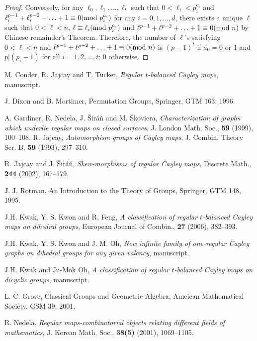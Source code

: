 \documentclass[12pt]{amsart}
\begin{document}
\begin{proof}
Conversely, for any $\ell_0, \ell_1, \ldots, \ell_t$ such that  $0
< \ell_i < p_i^{a_i}$ and  $\ell_i^{p-1} + \ell_i^{p-2} + \ldots +
1 \equiv  0 ({\hbox{\rm mod }} p_i^{a_i})$ for any $i = 0,1,\ldots, d$, there
exists a unique $\ell$ such that $0 < \ell < n$, $\ell \equiv \ell_i
({\hbox{\rm mod }} p_i^{a_i})$ and $\ell^{p-1}+\ell^{p-2}+\ldots+1 \equiv 0
({\hbox{\rm mod }} n)$ by Chinese remainder's Theorem. Therefore, the number of
$\ell$'s satisfying  $0 < \ell < n$ and
$\ell^{p-1}+\ell^{p-2}+\ldots+1 \equiv 0 ({\hbox{\rm mod }} n)$ is $(p-1)^{t}$
if $a_0=0$ or 1 and $p | (p_i -1)$ for all $i =1,2, \ldots, t$; 0
otherwise.
\end{proof}

\begin{thebibliography}{99}
 M. Conder, R. Jajcay and T. Tucker, \textit{Regular $t$-balanced Cayley maps}, manuscript.

 J. Dixon and B. Mortimer, Permutation Groups, Springer, GTM 163, 1996.

  A. Gardiner, R. Nedela, J. \v{S}ir\'{a}\v{n} and M. \v{S}koviera,
        \textit{Characterization of graphs which underlie regular maps on closed surfaces},
       J. London Math. Soc.,  {\bf 59} (1999), 100--108.
  R. Jajcay, \textit{Automorphism groups of Cayley maps},
J. Combin. Theory Ser. B, {\bf 59} (1993), 297--310.

 R. Jajcay and J. \v Sir\' a\v n, \textit{Skew-morphisms of regular
Cayley maps}, Discrete Math., {\bf 244} (2002), 167--179.

 J. J. Rotman, An Introduction to the Theory of Groups, Springer, GTM 148, 1995.

 J.H. Kwak, Y. S. Kwon and R. Feng, \textit{A classification of regular $t$-balanced Cayley maps on dihedral groups},
 European Journal of Combin., {\bf 27} (2006), 382--393.

 J.H. Kwak, Y. S. Kwon and J. M. Oh,
\textit{New infinite family of one-regular Cayley graphs on
dihedral groups for any given valency}, manuscript.

 J.H. Kwak and Ju-Mok Oh, \textit{A classification of regular $t$-balanced Cayley maps on dicyclic groups},
manuscript.

 L. C. Grove, Classical Groups and Geometric Algebra, Ameican Mathematical Society, GSM 39, 2001.

  R. Nedela,  \textit{Regular maps-combinatorial objects relating
     different fields of mathematics}, J. Korean Math. Soc.,  {\bf 38(5)} (2001), 1069--1105.


\end{thebibliography}
\end{document}

